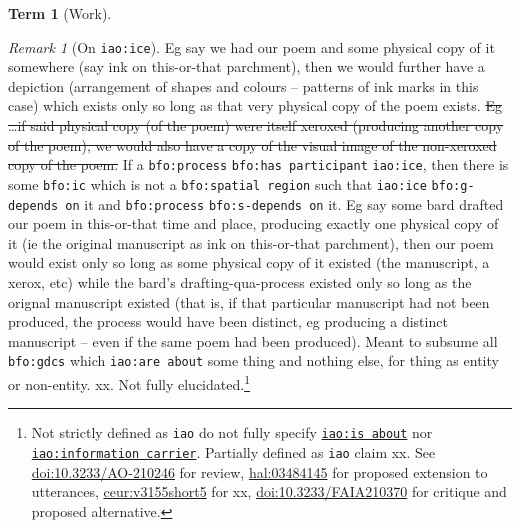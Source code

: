 \documentclass{amsart}%
\newcommand{\code}[1]{\texttt{#1}}%
\theoremstyle{plain}
\theoremstyle{definition}
\theoremstyle{remark}
\theoremstyle{definition}
\newtheorem{term}{Term}[subsection]%
\theoremstyle{remark}
\newtheorem*{term-note}{Remark}
\begin{document}
\begin{term}[Work]
\begin{term-note}[On \code{iao:ice}]
{%
Eg say we had our poem and some physical copy of it somewhere (say ink on this-or-that parchment), then we would further have a depiction (arrangement of shapes and colours -- patterns of ink marks in this case) which exists only so long as that very physical copy of the poem exists. \sout{Eg \ldots if said physical copy (of the poem) were itself xeroxed (producing another copy of the poem), we would also have a copy of the visual image of the non-xeroxed copy of the poem.} %
%
%
If a \code{bfo:process} \code{bfo:has participant} \code{iao:ice}, then there is some \code{bfo:ic} which is not a \code{bfo:spatial region} such that \code{iao:ice} \code{bfo:g-depends on} it and \code{bfo:process} \code{bfo:s-depends on} it. Eg say some bard drafted our poem in this-or-that time and place, producing exactly one physical copy of it (ie the original manuscript as ink on this-or-that parchment), then our poem would exist only so long as some physical copy of it existed (the manuscript, a xerox, etc) while the bard's drafting-qua-process existed only so long as the orignal manuscript existed (that is, if that particular manuscript had not been produced, the process would have been distinct, eg producing a distinct manuscript -- even if the same poem had been produced).%
%
%
} Meant to subsume all \code{bfo:gdcs} which \code{iao:are about} some thing and nothing else, for thing as entity or non-entity. xx. Not fully elucidated.\footnote{Not strictly defined as \code{iao} do not fully specify \href{http://purl.obolibrary.org/obo/IAO_0000136}{\code{iao:is about}} nor \href{http://purl.obolibrary.org/obo/IAO_0000015}{\code{iao:information carrier}}. %
%
%
Partially defined as \code{iao} claim xx. See \href{https://doi.org/10.3233/AO-210246}{doi:10.3233/AO-210246} for review, \href{https://hal.science/hal-03484145}{hal:03484145} for proposed extension to utterances, \href{https://ceur-ws.org/Vol-3155/short5.pdf}{ceur:v3155short5} for xx, \href{https://doi.org/10.3233/FAIA210370}{doi:10.3233/FAIA210370} for critique and proposed alternative.}

\end{term-note}
\end{term}
\end{document}
